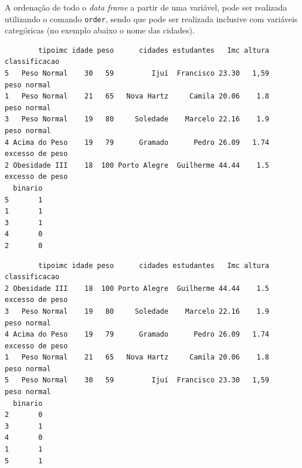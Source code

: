 \documentclass[12pt,brazil,oneside]{book}
\newenvironment{Shaded}{\begin{snugshade}}{\end{snugshade}}
\newcommand{\CommentTok}[1]{\textcolor[rgb]{0.56,0.35,0.01}{\textit{#1}}}
\newcommand{\DataTypeTok}[1]{\textcolor[rgb]{0.13,0.29,0.53}{#1}}
\newcommand{\KeywordTok}[1]{\textcolor[rgb]{0.13,0.29,0.53}{\textbf{#1}}}
\newcommand{\NormalTok}[1]{#1}
\newcommand{\OperatorTok}[1]{\textcolor[rgb]{0.81,0.36,0.00}{\textbf{#1}}}
\newcommand{\OtherTok}[1]{\textcolor[rgb]{0.56,0.35,0.01}{#1}}
\begin{document}
A ordenação de todo o \emph{data frame} a partir de uma variável, pode
ser realizada utilizando o comando \texttt{order}, sendo que pode ser
realizada inclusive com variáveis categóricas (no exemplo abaixo o nome
das cidades).

\begin{Shaded}
\end{Shaded}

\begin{verbatim}
        tipoimc idade peso      cidades estudantes   Imc altura   classificacao
5   Peso Normal    30   59         Ijuí  Francisco 23.30   1,59     peso normal
1   Peso Normal    21   65   Nova Hartz     Camila 20.06    1.8     peso normal
3   Peso Normal    19   80     Soledade    Marcelo 22.16    1.9     peso normal
4 Acima do Peso    19   79      Gramado      Pedro 26.09   1.74 excesso de peso
2 Obesidade III    18  100 Porto Alegre  Guilherme 44.44    1.5 excesso de peso
  binario
5       1
1       1
3       1
4       0
2       0
\end{verbatim}

\begin{Shaded}
\end{Shaded}

\begin{verbatim}
        tipoimc idade peso      cidades estudantes   Imc altura   classificacao
2 Obesidade III    18  100 Porto Alegre  Guilherme 44.44    1.5 excesso de peso
3   Peso Normal    19   80     Soledade    Marcelo 22.16    1.9     peso normal
4 Acima do Peso    19   79      Gramado      Pedro 26.09   1.74 excesso de peso
1   Peso Normal    21   65   Nova Hartz     Camila 20.06    1.8     peso normal
5   Peso Normal    30   59         Ijuí  Francisco 23.30   1,59     peso normal
  binario
2       0
3       1
4       0
1       1
5       1
\end{verbatim}

\begin{Shaded}
\end{Shaded}
\end{document}
